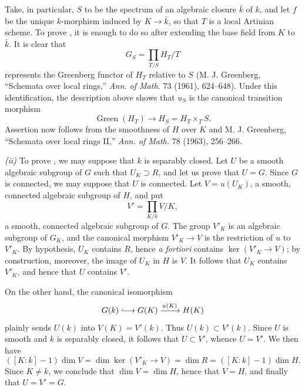 Take, in particular, \(S\) to be the spectrum of an algebraic
closure \(\bar k\) of \(k\), and let \(f\) be the unique
\(k\)-morphism induced by \(K\to\bar k\), so that \(T\) is a
local Artinian scheme.  To prove , it is enough to do so after
extending the base field from \(K\) to \(\bar k\).  It is clear
that
\[
  G_S=\prod_{T/S}H_T/T
\]
represents the Greenberg functor of \(H_T\) relative to \(S\)
(M. J. Greenberg, ``Schemata over local rings,'' \emph{Ann. of
Math.} 73 (1961), 624--648).  Under this identification, the
description above shows that \(u_S\) is the canonical transition
morphism
\[
  \operatorname{Green}(H_T)\longrightarrow
  H_S=H_T\times_T S.
\]
Assertion  now follows from the smoothness of \(H\) over \(K\)
and M. J. Greenberg, ``Schemata over local rings II,''
\emph{Ann. of Math.} 78 (1963), 256--266.

\smallskip
\noindent\textit{(ii)} To prove , we may suppose that \(k\)
is separably closed.  Let \(U\) be a smooth algebraic subgroup of
\(G\) such that \(U_K\supset R\), and let us prove that \(U=G\).
Since \(G\) is connected, we may suppose that \(U\) is connected.
Let \(V=u(U_K)\), a smooth, connected algebraic subgroup of
\(H\), and put
\[
  V'=\prod_{K/k}V/K,
\]
a smooth, connected algebraic subgroup of \(G\).  The group
\(V'_K\) is an algebraic subgroup of \(G_K\), and the canonical
morphism \(V'_K\to V\) is the restriction of \(u\) to \(V'_K\).
By hypothesis, \(U_K\) contains \(R\), hence \emph{a fortiori}
contains \(\ker(V'_K\to V)\); by construction, moreover, the
image of \(U_K\) in \(H\) is \(V\).  It follows that \(U_K\)
contains \(V'_K\), and hence that \(U\) contains \(V'\).

On the other hand, the canonical isomorphism
\[
  G(k)\lhook\joinrel\longrightarrow G(K)
    \xrightarrow{u(K)}H(K)
\]
plainly sends \(U(k)\) into \(V(K)=V'(k)\).  Thus
\(U(k)\subset V'(k)\).  Since \(U\) is smooth and \(k\) is
separably closed, it follows that \(U\subset V'\), whence
\(U=V'\).  We then have
\[
  ([K:k]-1)\dim V
  =\dim\ker(V'_K\to V)
  =\dim R
  =([K:k]-1)\dim H.
\]
Since \(K\ne k\), we conclude that \(\dim V=\dim H\), hence that
\(V=H\), and finally that \(U=V'=G\).



